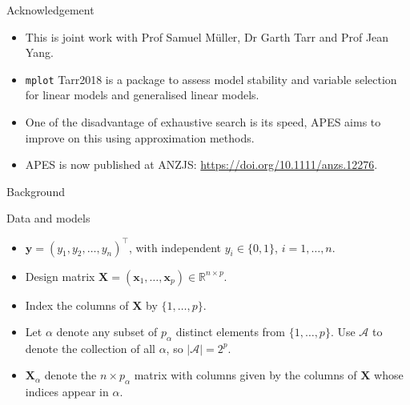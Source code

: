 \documentclass[12pt,aspectratio=169]{beamer}
\newcommand{\bx}{\boldsymbol{x}}
\newcommand{\bX}{\boldsymbol{X}}
\newcommand{\by}{\boldsymbol{y}}
\begin{document}
\begin{frame}{Acknowledgement}
\begin{itemize}
	\item This is joint work with Prof Samuel M\"{u}ller, Dr Garth Tarr and Prof Jean Yang.
	\item \texttt{mplot} Tarr2018 is a package to assess model stability and variable selection for linear models and generalised linear models.
	\item One of the disadvantage of exhaustive search is its speed, APES aims to improve on this using approximation methods.
	\item APES is now published at ANZJS: \url{https://doi.org/10.1111/anzs.12276}. 
\end{itemize}
\end{frame}


\begin{frame}
\Huge{\color{themeBlue} Background}
\end{frame}


\begin{frame}{Data and models}
	\begin{itemize}
		\item $ \by = (y_1, y_2, \dots, y_n)^\top $, with independent $ y_i  \in \lbrace0, 1\rbrace$, $ i = 1, \dots, n $. 
		\item Design matrix $ \bX = (\bx_1, \dots, \bx_p) \in \mathbb{R}^{n \times p}$. 
		\item Index the columns of $ \bX $ by $ \lbrace 1, \dots, p \rbrace$. 
		\item 
		Let $ \alpha $ denote any subset of $ p_\alpha $ distinct elements from $ \lbrace 1, \dots, p \rbrace $. Use $ \mathcal{A} $ to denote the collection of all $ \alpha $, so $ |\mathcal{A}| = 2^p $.
		
		\item $ \bX_\alpha $ denote the $ n \times p_\alpha $ matrix with columns given by the columns of $ \bX $ whose indices appear in $ \alpha $.
	\end{itemize}
\end{frame}
\end{document}
